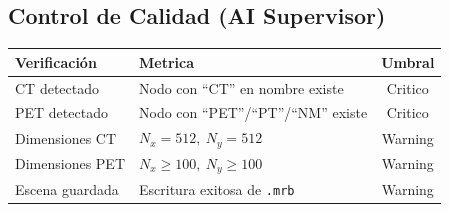 \documentclass[12pt,a4paper]{article}
\begin{document}
\begin{tcolorbox}[aiSupervisor]
\subsection*{Control de Calidad (AI Supervisor)}

\begin{table}[H]
\centering
\begin{tabular}{llc}
\toprule
\textbf{Verificación} & \textbf{Metrica} & \textbf{Umbral} \\
\midrule
CT detectado & Nodo con ``CT'' en nombre existe & Critico \\
PET detectado & Nodo con ``PET''/``PT''/``NM'' existe & Critico \\
Dimensiones CT & $N_x = 512,\ N_y = 512$ & Warning \\
Dimensiones PET & $N_x \geq 100,\ N_y \geq 100$ & Warning \\
Escena guardada & Escritura exitosa de \texttt{.mrb} & Warning \\
\bottomrule
\end{tabular}
\end{table}

\newpage


\newpage


\newpage


\newpage


\newpage


\newpage


\newpage


\newpage

\end{tcolorbox}
\end{document}
